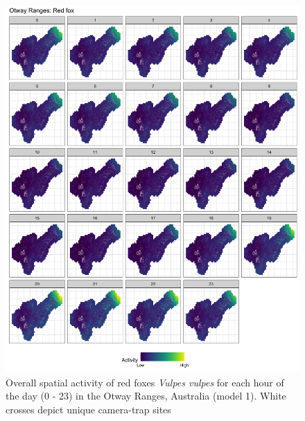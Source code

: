 \documentclass[]{elsarticle} %
\begin{document}
\begin{figure}

{\centering \includegraphics[width=1\linewidth]{../figs/spte_facet_o_fox} 

}

\caption{Overall spatial activity of red foxes \textit{Vulpes vulpes} for each hour of the day (0 - 23) in the Otway Ranges, Australia (model 1). White crosses depict unique camera-trap sites}\label{fig:diel-space-o-fox}
\end{figure}

\newpage
\end{document}
